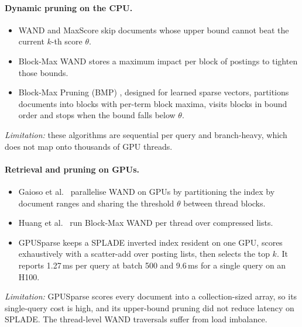\documentclass[11pt]{article}
\begin{document}
\paragraph{Dynamic pruning on the CPU.}
\begin{itemize}
\item WAND \cite{wand} and MaxScore \cite{maxscore} skip documents whose upper bound cannot beat the
  current $k$-th score $\theta$.
\item Block-Max WAND \cite{bmw} stores a maximum impact per block of postings to tighten those bounds.
\item Block-Max Pruning (BMP) \cite{bmp}, designed for learned sparse vectors, partitions documents into
  blocks with per-term block maxima, visits blocks in bound order and stops when the bound falls below
  $\theta$.
\end{itemize}
\emph{Limitation:} these algorithms are sequential per query and branch-heavy, which does not map onto
thousands of GPU threads.

\paragraph{Retrieval and pruning on GPUs.}
\begin{itemize}
\item Gaioso et al.\ \cite{gaiosowand} parallelise WAND on GPUs by partitioning the index by document
  ranges and sharing the threshold $\theta$ between thread blocks.
\item Huang et al.\ \cite{huangbmw} run Block-Max WAND per thread over
  compressed lists.
\item GPUSparse \cite{gpusparse} keeps a SPLADE inverted index resident on one GPU, scores exhaustively
  with a scatter-add over posting lists, then selects the top $k$. It reports 1.27\,ms per query at
  batch 500 and 9.6\,ms for a single query on an H100.
\end{itemize}
\emph{Limitation:} GPUSparse scores every document into a collection-sized array, so its single-query
cost is high, and its upper-bound pruning did not reduce latency on SPLADE. The thread-level WAND
traversals suffer from load imbalance.
\end{document}
